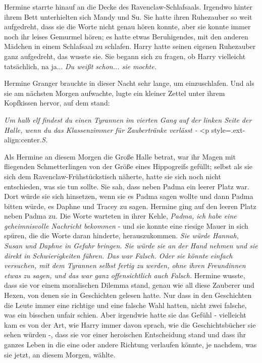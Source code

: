 Hermine starrte hinauf an die Decke des Ravenclaw-Schlafsaals. Irgendwo hinter
ihrem Bett unterhielten sich Mandy und Su. Sie hatte ihren Ruhezauber so weit
aufgedreht, dass sie die Worte nicht genau hören konnte, aber sie konnte immer
noch ihr leises Gemurmel hören; es hatte etwas Beruhigendes, mit den anderen
Mädchen in einem Schlafsaal zu schlafen. Harry hatte seinen eigenen Ruhezauber
ganz aufgedreht, das wusste sie. Sie begann sich zu fragen, ob Harry vielleicht
tatsächlich, na ja... \emph{Du weißt schon... sie mochte.}

Hermine Granger brauchte in dieser Nacht sehr lange, um einzuschlafen. Und als
sie am nächsten Morgen aufwachte, lugte ein kleiner Zettel unter ihrem
Kopfkissen hervor, auf dem stand:

\emph{\glqq{}Um halb elf findest du
einen Tyrannen im vierten Gang auf der linken Seite der Halle, wenn du das
Klassenzimmer für Zaubertränke verlässt -}   <p
style=\grqq{}.ext-align:center\grqq{}.\emph{S.\grqq{}}

Als Hermine an diesem Morgen die Große Halle betrat, war ihr Magen mit
fliegenden Schmetterlingen von der Größe eines Hippogreifs gefüllt; selbst als
sie sich dem Ravenclaw-Frühstückstisch näherte, hatte sie sich noch nicht
entschieden, was sie tun sollte. Sie sah, dass neben Padma ein leerer Platz war.
Dort würde sie sich hinsetzen, wenn sie es Padma sagen wollte und dann Padma
bitten würde, es Daphne und Tracey zu sagen. Hermine ging auf den leeren Platz
neben Padma zu. Die Worte warteten in ihrer Kehle, \emph{Padma, ich habe eine
geheimnisvolle Nachricht bekommen} - und sie konnte eine riesige Mauer in sich
spüren, die die Worte daran hinderte, herauszukommen. \emph{Sie würde Hannah,
Susan und Daphne in Gefahr bringen. Sie würde sie an der Hand nehmen und sie
direkt in Schwierigkeiten führen. Das war Falsch. Oder sie könnte einfach
versuchen, mit dem Tyrannen selbst fertig zu werden, ohne ihren Freundinnen
etwas zu sagen, und das war ganz offensichtlich auch Falsch.} Hermine wusste,
dass sie vor einem moralischen Dilemma stand, genau wie all diese Zauberer und
Hexen, von denen sie in Geschichten gelesen hatte. Nur dass in den Geschichten
die Leute immer eine richtige und eine falsche Wahl hatten, nicht zwei falsche,
was ein bisschen unfair schien. Aber irgendwie hatte sie das Gefühl - vielleicht
kam es von der Art, wie Harry immer davon sprach, wie die Geschichtsbücher sie
sehen würden -, dass sie vor einer heroischen Entscheidung stand und dass ihr
ganzes Leben in die eine oder andere Richtung verlaufen könnte, je nachdem, was
sie jetzt, an diesem Morgen, wählte.

